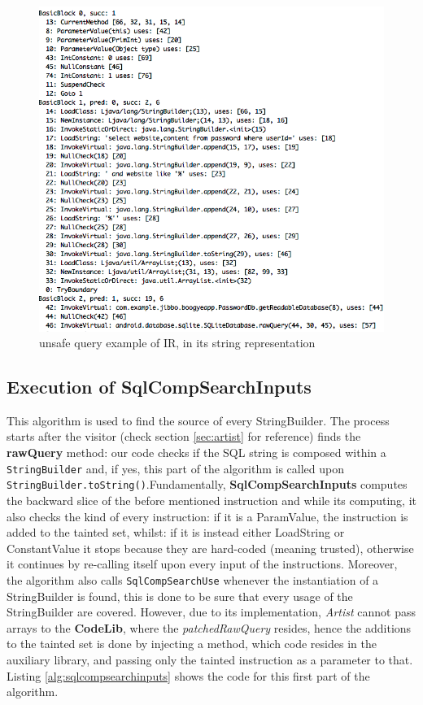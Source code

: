 \begin{figure}
	\centering
	\includegraphics[scale=0.7]{img/query_graph.png}
	\caption{unsafe query example of IR, in its string representation}
    \label{fig:querygraph}
\end{figure}
\newpage
\subsection{Execution of SqlCompSearchInputs}
This algorithm is used to find the source of every StringBuilder. The process starts after the visitor (check section \ref{sec:artist} for reference) finds the \textbf{rawQuery} method: our code checks if the SQL string is composed within a \texttt{StringBuilder} and, if yes, this part of the algorithm is called upon \newline\texttt{StringBuilder.toString()}.\newline Fundamentally, \textbf{SqlCompSearchInputs} computes the backward slice of the before mentioned instruction and while its computing, it also checks the kind of every instruction: if it is a ParamValue, the instruction is added to the tainted set, whilst: if it is instead either LoadString or ConstantValue it stops because they are hard-coded (meaning trusted), otherwise it continues by re-calling itself upon every input of the instructions. Moreover, the algorithm also calls \texttt{SqlCompSearchUse} whenever the instantiation of a StringBuilder is found, this is done to be sure that every usage of the StringBuilder are covered. However, due to its implementation, \emph{Artist} cannot pass arrays to the \textbf{CodeLib}, where the \emph{patchedRawQuery} resides, hence the additions to the tainted set is done by injecting a method, which code resides in the auxiliary library, and passing only the tainted instruction as a parameter to that. Listing \ref{alg:sqlcompsearchinputs} shows the code for this first part of the algorithm.

